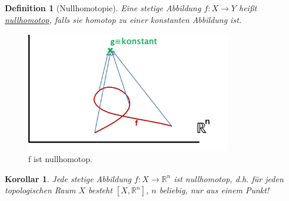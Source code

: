 \documentclass[a4paper,11pt,notitlepage]{report}
\newtheorem{definition}{Definition}[chapter]
\newtheorem{corollary}{Korollar}[chapter]
\newcommand{\R}{{\ensuremath{\mathbb{R}}}}
\begin{document}
\begin{definition}[Nullhomotopie]
Eine stetige Abbildung $f \colon X \rightarrow Y$ heißt \underline{nullhomotop}, falls sie homotop zu einer konstanten Abbildung ist.
\end{definition}

\begin{figure}[h]
\centering
\includegraphics[width=0.8\textwidth]{images/Nullhomotopie.jpg}
\caption{f ist nullhomotop.}
\end{figure}

\begin{corollary}
Jede stetige Abbildung $f \colon X \rightarrow \R^n$ ist nullhomotop, d.h. für jeden topologischen Raum $X$ besteht $[X, \R^n]$, $n$ beliebig, nur aus einem Punkt!
\end{corollary}
\end{document}
